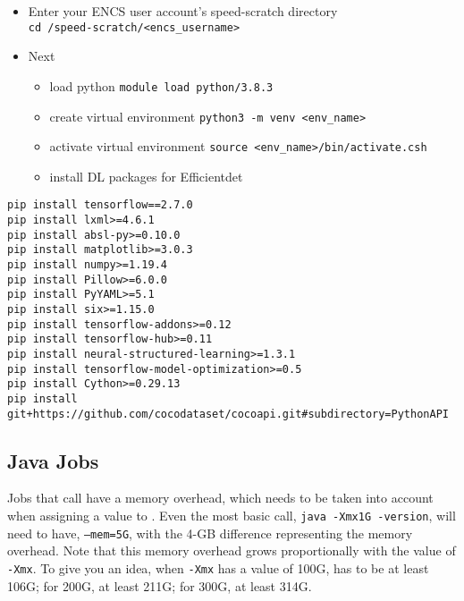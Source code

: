 \begin{itemize}
    \item 
    Enter your ENCS user account's speed-scratch directory\\ 
    \verb!cd /speed-scratch/<encs_username>!
    \item
		Next
		\begin{itemize}
			\item 
    load python \verb!module load python/3.8.3!
			\item 
    create virtual environment \verb!python3 -m venv <env_name>!
			\item 
    activate virtual environment \verb!source <env_name>/bin/activate.csh!
			\item 
    install DL packages for Efficientdet
		\end{itemize}
\end{itemize}
\small
\begin{verbatim}
pip install tensorflow==2.7.0
pip install lxml>=4.6.1
pip install absl-py>=0.10.0
pip install matplotlib>=3.0.3
pip install numpy>=1.19.4
pip install Pillow>=6.0.0
pip install PyYAML>=5.1
pip install six>=1.15.0
pip install tensorflow-addons>=0.12
pip install tensorflow-hub>=0.11
pip install neural-structured-learning>=1.3.1
pip install tensorflow-model-optimization>=0.5
pip install Cython>=0.29.13
pip install git+https://github.com/cocodataset/cocoapi.git#subdirectory=PythonAPI
\end{verbatim}
\normalsize

\subsection{Java Jobs}
\label{sect:java}

Jobs that call  have a memory overhead, which needs to be taken 
into account when assigning a value to . Even the most basic 
 call, \texttt{java -Xmx1G -version}, will need to have,
\texttt{--mem=5G}, with the 4-GB difference representing the memory overhead. 
Note that this memory overhead grows proportionally with the value of
\texttt{-Xmx}. To give you an idea, when \texttt{-Xmx} has a value of 100G,
 has to be at least 106G; for 200G, at least 211G; for 300G, at least 314G.

